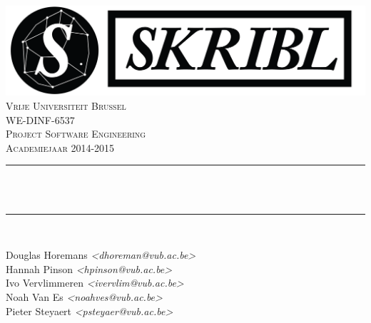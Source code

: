 \makeatletter
\begin{titlepage}

\newcommand{\HRule}{\rule{\linewidth}{0.7mm}} %


\vspace*{1.2mm}

\center 
\includegraphics[scale=0.6]{Logo.png}\\[1cm] 

\textsc{\LARGE Vrije Universiteit Brussel}\\[0.3cm] %
\textsc{\large WE-DINF-6537}\\
\textsc{\large Project Software Engineering}\\
\textsc{\large Academiejaar 2014-2015}\\[0.3cm] 


\HRule \\[0.4cm]
{ \huge \bfseries \@title \\[0.5cm] }
\HRule \\[0.5cm]
 

\Large

Douglas Horemans \textit{<dhoreman@vub.ac.be>}\\
Hannah Pinson \textit{<hpinson@vub.ac.be>}\\
Ivo Vervlimmeren \textit{<ivervlim@vub.ac.be>}\\
Noah Van Es \textit{<noahves@vub.ac.be>}\\
Pieter Steyaert \textit{<psteyaer@vub.ac.be>}\\


\end{titlepage}
